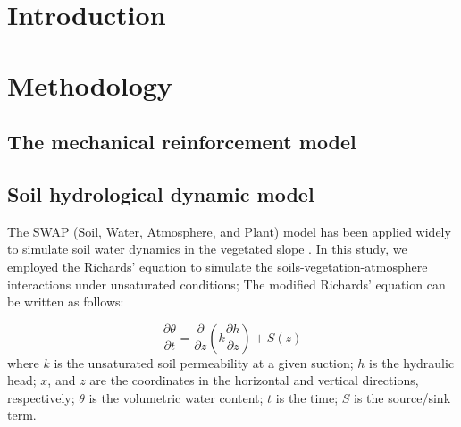 

\date{Received: date / Accepted: date}


\maketitle


\begin{abstract}





\end{abstract}

\section{Introduction}


\section{Methodology}

\subsection{The mechanical reinforcement model}

\subsection{Soil hydrological dynamic model}

The SWAP (Soil, Water, Atmosphere, and Plant) model has been applied widely to simulate soil water dynamics in the vegetated slope \citep{Romano2011Par}. In this study, we employed the Richards' equation to simulate the soils-vegetation-atmosphere interactions under unsaturated conditions; The modified Richards' equation can be written as follows:

\begin{equation}\frac{\partial \theta}{\partial t}=\frac{\partial}{\partial z}(k\frac{\partial h}{\partial z}) + S(z)\end{equation}
where $k$ is the unsaturated soil permeability at a given suction; $h$ is the hydraulic head; $x$, and $z$ are the coordinates in the horizontal and vertical directions, respectively; $\theta$ is the volumetric water content; $t$ is the time; $S$ is the source/sink term.

